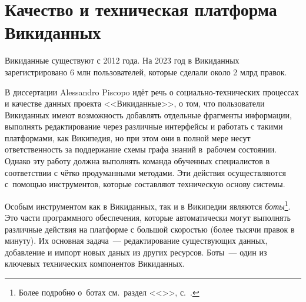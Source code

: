 \section{Качество и техническая платформа Викиданных}

Викиданные существуют с 2012 года. 
На 2023 год в Викиданных зарегистрировано 6 млн пользователей, которые сделали около 2 млрд правок.

В диссертации Alessandro Piscopo\autocite{Piscopo} идёт речь 
о социально-технических процессах и качестве данных проекта <<Викиданные>>, 
о том, что пользователи Викиданных имеют возможность добавлять отдельные фрагменты информации, 
выполнять редактирование через различные интерфейсы 
и работать с такими платформами, как Википедия, 
но при этом они в полной мере несут ответственность за поддержание схемы 
графа знаний\autocite{KnowledgeGraphs} в~рабочем состоянии. 
Однако эту работу должна выполнять команда обученных специалистов 
в соответствии с чётко продуманными методами. 
Эти действия осуществляются с~помощью инструментов, которые составляют техническую основу системы.


Особым инструментом как в Викиданных, так и в Википедии являются \emph{боты}\footnote{%
%
Более подробно о~ботах см.~раздел <<>>, с.~\pageref{ch:bots}.%
%
}. Это части программного обеспечения, которые автоматически могут выполнять 
различные действия на платформе с большой скоростью (более тысячи правок в минуту). 
Их основная задача~--- редактирование существующих данных, добавление и импорт новых даных из других ресурсов. 
Боты~--- один из ключевых технических компонентов Викиданных. 

